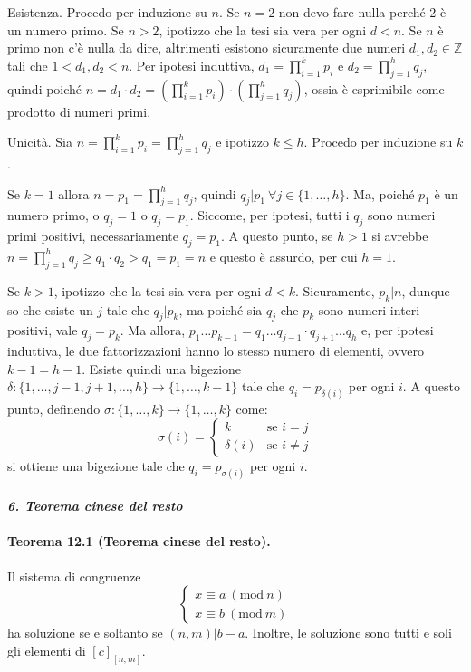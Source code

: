 \documentclass[12pt, a4paper]{report}
\theoremstyle{definition}
\newcommand{\Z}{\mathbb{Z}}
\newcommand{\Mod}[1]{\ (\mathrm{mod}\ #1)}
\begin{document}
\begin{demonstration}
    Esistenza. Procedo per induzione su $n$. Se $n=2$ non devo fare nulla
    perché 2 è un numero primo. Se $n>2$, ipotizzo che la tesi sia vera per
    ogni $d<n$. Se $n$ è primo non c'è nulla da dire, altrimenti esistono
    sicuramente due numeri $d_1,d_2\in\Z$ tali che $1<d_1,d_2<n$. Per ipotesi
    induttiva, $d_1=\prod_{i=1}^kp_i$ e $d_2=\prod_{j=1}^hq_j$, quindi poiché
    $n=d_1\cdot d_2=\left(\prod_{i=1}^{k}p_i\right)\cdot\left(\prod_{j=1}^hq_j
    \right)$, ossia è esprimibile come prodotto di numeri primi.
    
    \newpage
    Unicità. Sia $n=\prod_{i=1}^kp_i=\prod_{j=1}^hq_j$ e ipotizzo $k\leq h$.
    Procedo per induzione su $k$.
    
    Se $k=1$ allora $n=p_1=\prod_{j=1}^hq_j$, quindi $q_j|p_1\ \forall j\in\{1,
    \dots,h\}$. Ma, poiché $p_1$ è un numero primo, o $q_j=1$ o $q_j=p_1$. Siccome,
    per ipotesi, tutti i $q_j$ sono numeri primi positivi, necessariamente $q_j=p_1$.
    A questo punto, se $h>1$ si avrebbe $n=\prod_{j=1}^hq_j\geq q_1\cdot q_2>
    q_1=p_1=n$ e questo è assurdo, per cui $h=1$.

    Se $k>1$, ipotizzo che la tesi sia vera per ogni $d<k$. Sicuramente, $p_k|n$,
    dunque so che esiste un $j$ tale che $q_j|p_k$, ma poiché sia $q_j$ che $p_k$
    sono numeri interi positivi, vale $q_j=p_k$. Ma allora, $p_1\dots p_{k-1}=q_1\dots
    q_{j-1}\cdot q_{j+1}\dots q_h$ e, per ipotesi induttiva, le due fattorizzazioni
    hanno lo stesso numero di elementi, ovvero $k-1=h-1$. Esiste quindi una
    bigezione \mbox{$\delta:\{1,\dots,j-1,j+1,\dots,h\}\to\{1,\dots,k-1\}$} tale
    che $q_i=p_{\delta(i)}$ per ogni $i$. A questo punto, definendo
    $\sigma:\{1,\dots,k\}\to\{1,\dots,k\}$ come:
    \[\sigma(i)=\begin{cases}
        k & \text{se } i=j\\
        \delta(i) & \text{se } i\neq j
    \end{cases}\]
    si ottiene una bigezione tale che $q_i=p_{\sigma(i)}$ per ogni $i$.
\end{demonstration}

\paragraph{\emph{6. Teorema cinese del resto}}
\paragraph{Teorema 12.1 (Teorema cinese del resto).}
Il sistema di congruenze
\[\begin{cases}
    x\equiv a\Mod{n}\\
    x\equiv b\Mod{m}
\end{cases}\]
ha soluzione se e soltanto se $(n,m)|b-a$. Inoltre, le soluzione sono tutti e
soli gli elementi di $[c]_{[n,m]}$.
\end{document}
